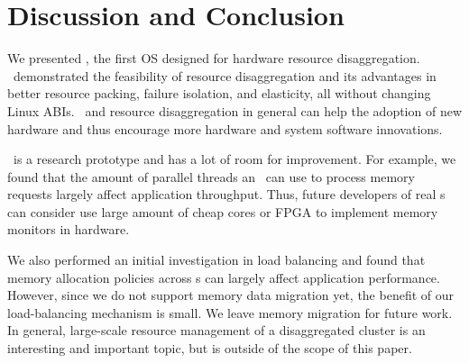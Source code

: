 \section{Discussion and Conclusion}
\label{sec:lego:conclude}

We presented \lego, the first OS designed for hardware resource disaggregation.
\lego\ demonstrated the feasibility of resource disaggregation and its advantages in 
better resource packing, failure isolation, and elasticity, all without changing Linux ABIs.
\lego\ and resource disaggregation in general can help the adoption of new hardware
and thus encourage more hardware and system software innovations.  

\lego\ is a research prototype and has a lot of room for improvement.
For example, we found that the amount of parallel threads an \mcomponent\ can 
use to process memory requests largely affect application throughput. 
Thus, future developers of real \mcomponent{}s can consider use 
large amount of cheap cores or FPGA to implement memory monitors in hardware.

We also performed an initial investigation in load balancing 
and found that memory allocation policies across \mcomponent{}s can largely affect application performance.
However, since we do not support memory data migration yet, 
the benefit of our load-balancing mechanism is small.
We leave memory migration for future work.
In general, large-scale resource management of a disaggregated cluster is 
an interesting and important topic, but is outside of the scope of this paper.